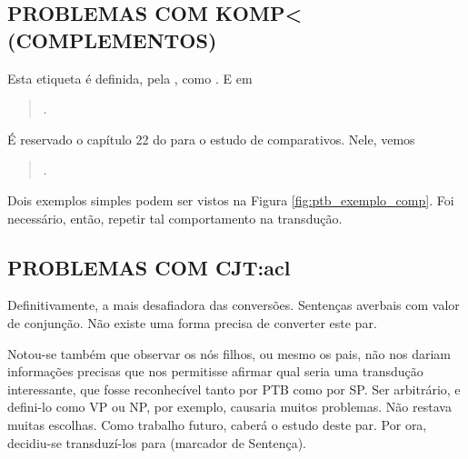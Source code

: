 \subsection{PROBLEMAS COM KOMP< (COMPLEMENTOS)}
\label{subsec:tag_komp}
Esta etiqueta é definida, pela , como . E em  
\begin{quote}
    .
\end{quote}
É reservado o capítulo 22 do  para o estudo de comparativos. Nele, vemos 
\begin{quote}
    .
\end{quote}
Dois exemplos simples podem ser vistos na Figura \ref{fig:ptb_exemplo_comp}. Foi necessário, então, repetir tal comportamento na transdução.
\begin{center}
    
\end{center}
\subsection{PROBLEMAS COM CJT:acl}
\label{subsec:CJT_acl}
Definitivamente, a mais desafiadora das conversões. Sentenças averbais com valor de conjunção. Não existe uma forma precisa de converter este par. 

Notou-se também que observar os nós filhos, ou mesmo os pais, não nos dariam informações precisas que nos permitisse afirmar qual seria uma transdução interessante, que fosse reconhecível tanto por PTB como por SP. Ser arbitrário, e defini-lo como VP ou NP, por exemplo, causaria muitos problemas. Não restava muitas escolhas. Como trabalho futuro, caberá o estudo deste par. Por ora, decidiu-se transduzí-los para  (marcador de Sentença).
